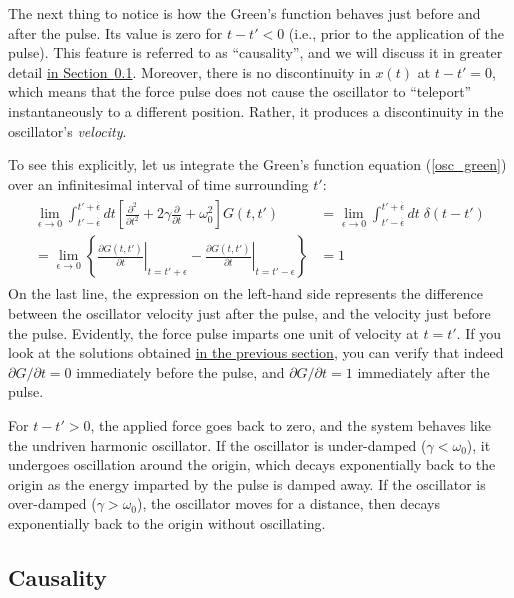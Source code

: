 \documentclass[10pt,a4paper]{article}
\begin{document}
The next thing to notice is how the Green's function behaves just
before and after the pulse. Its value is zero for $t - t' < 0$ (i.e.,
prior to the application of the pulse). This feature is referred to as
``causality'', and we will discuss it in greater detail
\hyperref[causality]{in Section~\ref{causality}}. Moreover, there is
no discontinuity in $x(t)$ at $t - t' = 0$, which means that the force
pulse does not cause the oscillator to ``teleport'' instantaneously to
a different position. Rather, it produces a discontinuity in the
oscillator's \emph{velocity}.

To see this explicitly, let us integrate the Green's function equation
(\ref{osc_green}) over an infinitesimal interval of time surrounding
$t'$:
\begin{align}
  \begin{aligned}
    \lim_{\epsilon \rightarrow 0} \int_{t'-\epsilon}^{t'+\epsilon} dt
    \left[\frac{\partial^2}{\partial t^2} + 2\gamma\frac{\partial}{\partial t}
      + \omega_0^2\right] G(t,t') &= \lim_{\epsilon \rightarrow 0}
    \int_{t'-\epsilon}^{t'+\epsilon} dt \; \delta(t-t') \\
    = \lim_{\epsilon \rightarrow 0} \left\{ \left.\frac{\partial G(t,t')}{\partial t}
    \right|_{t = t' +\epsilon}
    - \left.\frac{\partial G(t,t')}{\partial t}\right|_{t = t' - \epsilon}\right\}
    &= 1
  \end{aligned}
\end{align}
On the last line, the expression on the left-hand side represents the
difference between the oscillator velocity just after the pulse, and
the velocity just before the pulse. Evidently, the force pulse imparts
one unit of velocity at $t=t'$. If you look at the solutions obtained
\hyperref[finding-the-greens-function]{in the previous section}, you
can verify that indeed $\partial G/\partial t = 0$ immediately before
the pulse, and $\partial G/\partial t = 1$ immediately after the
pulse.

For $t - t' > 0$, the applied force goes back to zero, and the system
behaves like the undriven harmonic oscillator. If the oscillator is
under-damped ($\gamma < \omega_0$), it undergoes oscillation around
the origin, which decays exponentially back to the origin as the
energy imparted by the pulse is damped away. If the oscillator is
over-damped ($\gamma > \omega_0$), the oscillator moves for a
distance, then decays exponentially back to the origin without
oscillating.

\subsection{Causality}\label{causality}
\end{document}
